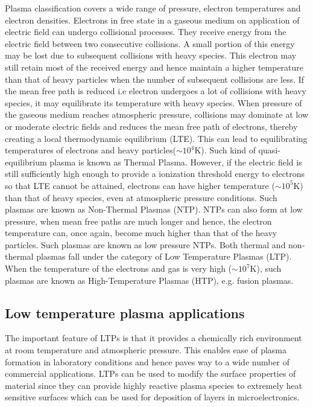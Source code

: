 \documentclass[paper=a4, fontsize=13pt]{scrartcl}
\begin{document}
Plasma classification covers a wide range of pressure, electron temperatures and electron densities. Electrons in free state in a gaseous medium on application of electric field can undergo collisional processes. They receive energy from the electric field between two consecutive collisions. A small portion of this energy may be lost due to subsequent collisions with heavy species. This electron may still retain most of the received energy and hence maintain a higher temperature than that of heavy particles when the number of subsequent collisions are less. If the mean free path is reduced i.e electron undergoes a lot of collisions with heavy species, it may equilibrate its temperature with heavy species. When pressure of the gaseous medium reaches atmospheric pressure, collisions may dominate at low or moderate electric fields and reduces the mean free path of electrons, thereby creating a local thermodynamic equilibrium (LTE). This can lead to equilibrating temperatures of electrons and heavy particles($\sim10^4$K). Such kind of quasi-equilibrium plasma is known as Thermal Plasma. However, if the electric field is still sufficiently high enough to provide a ionization threshold energy to electrons so that LTE cannot be attained, electrons can have higher temperature ($\sim10^5$K) than that of heavy species, even at atmospheric pressure conditions. Such plasmas are known as Non-Thermal Plasmas (NTP). NTPs can also form at low pressure, when mean free paths are much longer and hence, the electron temperature can, once again, become much higher than that of the heavy particles. Such plasmas are known as low pressure NTPs. Both thermal and non-thermal plasmas fall under the category of Low Temperature Plasmas (LTP). When the temperature of the electrons and gas is very high ($\sim10^7$K), such plasmas are known as High-Temperature Plasmas (HTP), e.g. fusion plasmas.

\subsection{Low temperature plasma applications}

The important feature of LTPs is that it provides a chemically rich environment at room temperature and atmospheric pressure. This enables ease of plasma formation in laboratory conditions and hence paves way to a wide number of commercial applications. LTPs can be used to modify the surface properties of material \cite{Bonizzoni2002PlasmaApplications} since they can provide highly reactive plasma species to extremely heat sensitive surfaces \cite{Kogelschatz2002FilamentaryDischarges} which can be used for deposition of layers in microelectronics. 
\end{document}

